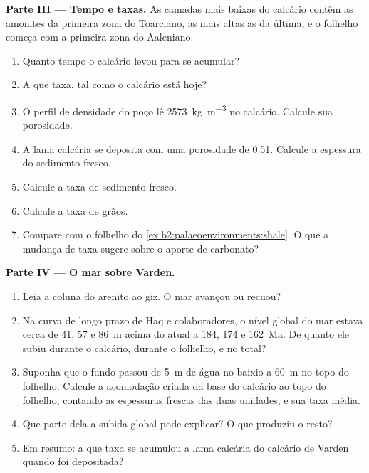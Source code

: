 \begin{problem}
\medskip\noindent\textbf{Parte III --- Tempo e taxas.} As camadas mais baixas do calcário contêm as
amonites da primeira zona do Toarciano, as mais altas as da última, e o folhelho começa com
a primeira zona do Aaleniano.
\begin{enumerate}[resume]
  \item Quanto tempo o calcário levou para se acumular?
  \item A que taxa, tal como o calcário está hoje?
  \item O perfil de densidade do poço lê \qty{2573}{kg.m^{-3}} no calcário. Calcule sua
        porosidade.
  \item A lama calcária se deposita com uma porosidade de 0.51. Calcule a espessura do sedimento fresco.
  \item Calcule a taxa de sedimento fresco.
  \item Calcule a taxa de grãos.
  \item Compare com o folhelho do \cref{ex:b2:palaeoenvironments:shale}. O que a mudança de
        taxa sugere sobre o aporte de carbonato?
\end{enumerate}

\medskip\noindent\textbf{Parte IV --- O mar sobre Varden.}
\begin{enumerate}[resume]
  \item Leia a coluna do arenito ao giz. O mar avançou ou recuou?
  \item Na curva de longo prazo de Haq e colaboradores, o nível global do mar estava cerca de 41, 57 e
        \qty{86}{m} acima do atual a 184, 174 e \qty{162}{Ma}. De quanto ele subiu durante o
        calcário, durante o folhelho, e no total?
  \item Suponha que o fundo passou de \qty{5}{m} de água no baixio a \qty{60}{m} no topo do
        folhelho. Calcule a acomodação criada da base do calcário ao topo do
        folhelho, contando as espessuras frescas das duas unidades, e sua taxa média.
  \item Que parte dela a subida global pode explicar? O que produziu o resto?
  \item Em resumo: a que taxa se acumulou a lama calcária do calcário de Varden quando foi
        depositada?
\end{enumerate}
\end{problem}
